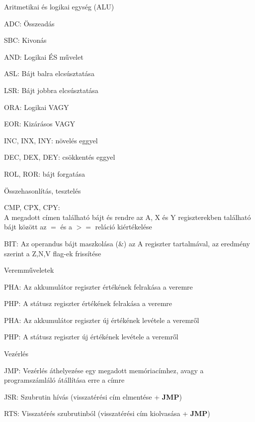 \begin{compactdesc}
	\item Aritmetikai és logikai egység (ALU)
	\begin{compactdesc}
		\item[ADC:] Összeadás
		\item[SBC:] Kivonás
		\item[AND:] Logikai ÉS művelet
		\item[ASL:] Bájt balra elcsúsztatása
		\item[LSR:] Bájt jobbra elcsúsztatása
		\item[ORA:] Logikai VAGY
		\item[EOR:] Kizárásos VAGY
		\item[INC, INX, INY:] növelés eggyel
		\item[DEC, DEX, DEY:] csökkentés eggyel
		\item[ROL, ROR:] bájt forgatása
	\end{compactdesc}
	\item 
	Összehasonlítás, tesztelés
	\begin{compactdesc}
		\item[CMP, CPX, CPY:]  \hfill \\ A megadott címen található bájt és rendre az A, X és Y regiszterekben található bájt között az $=$ és a $>=$ reláció kiértékelése
		\item[BIT:] Az operandus bájt maszkolása (\&) az A regiszter tartalmával, az eredmény szerint a Z,N,V flag-ek frissítése 
	\end{compactdesc}
	\item Veremműveletek
	\begin{compactdesc}
		\item[PHA:] Az akkumulátor regiszter értékének felrakása a veremre 
		\item[PHP:] A státusz regiszter értékének felrakása a veremre
		\item[PHA:] Az akkumulátor regiszter új értékének levétele a veremről
		\item[PHP:] A státusz regiszter új értékének levétele a veremről
	\end{compactdesc}
	\item Vezérlés
	\begin{compactdesc}
		\item[JMP:] Vezérlés áthelyezése egy megadott memóriacímhez, avagy a programszámláló átállítása erre a címre
		\item[JSR:] Szubrutin hívás (visszatérési cím elmentése + \textbf{JMP})
		\item[RTS:] Visszatérés szubrutinból (visszatérési cím kiolvasása + \textbf{JMP})

\end{compactdesc}
\end{compactdesc}
